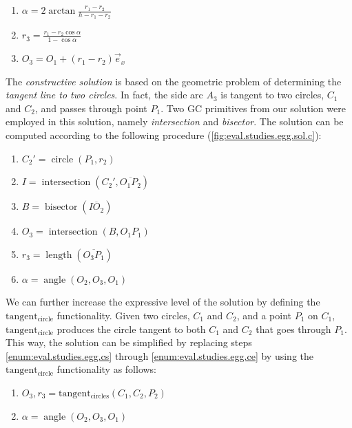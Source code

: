 \begin{enumerate}
  \item $\alpha = 2\arctan\frac{r_1 - r_2}{h - r_1 - r_2}$
  \item $r_3 = \frac{r_1 - r_2 \cos\alpha}{1 - \cos\alpha}$
  \item $O_3 = O_1 + \left(r_1 - r_2\right)\vec{e}_x$
\end{enumerate}

The \textit{constructive solution} is based on the geometric problem of
determining the \textit{tangent line to two circles}.  In fact, the side arc
$A_3$ is tangent to two circles, $C_1$ and $C_2$, and passes through point
$P_1$.  Two \ac{GC} primitives from our solution were employed in this
solution, namely \textit{intersection} and \textit{bisector}.  The solution can
be computed according to the following procedure
(\cref{fig:eval.studies.egg.sol.c}):

\begin{enumerate}
  \item $C_{2}' = \operatorname{circle}\left(P_1, r_2\right)$%
  \label{enum:eval.studies.egg.cs}
  \item $I = \operatorname{intersection}\left(C_{2}', \overline{O_1 P_2}\right)$
  \item $B = \operatorname{bisector}\left(\overline{IO_2}\right)$
  \item $O_3 = \operatorname{intersection}\left(B, O_1 P_1\right)$
  \item $r_3 = \operatorname{length}\left(\overline{O_3 P_1}\right)$%
  \label{enum:eval.studies.egg.ce}
  \item $\alpha = \operatorname{angle}\left(O_2,O_3,O_1\right)$
\end{enumerate}

We can further increase the expressive level of the solution by defining the
$\operatorname{tangent_{circle}}$ functionality.  Given two circles, $C_1$ and
$C_2$, and a point $P_1$ on $C_1$, $\operatorname{tangent_{circle}}$ produces
the circle tangent to both $C_1$ and $C_2$ that goes through $P_1$.  This way,
the solution can be simplified by replacing steps \ref{enum:eval.studies.egg.cs}
through \ref{enum:eval.studies.egg.ce} by using the
$\operatorname{tangent_{circle}}$ functionality as follows:

\begin{enumerate}
  \item $O_3,r_3 = \operatorname{tangent_{circles}}\left(C_1, C_2, P_2\right)$
  \item $\alpha = \operatorname{angle}\left(O_2, O_3, O_1\right)$
\end{enumerate}

